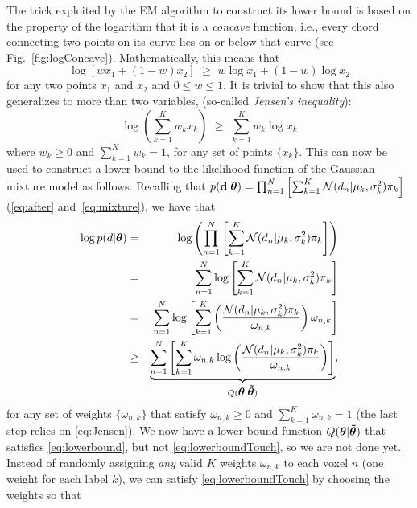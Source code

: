 \documentclass[10pt,twoside]{book}
\begin{document}
The trick exploited by the EM algorithm to construct its lower bound is based on the property of the logarithm that it is a \emph{concave} function, 
i.e., every chord connecting two points on its curve lies on or below that curve (see Fig.~\ref{fig:logConcave}). Mathematically, this means that
\begin{equation}
  \log \left[ w x_1 + ( 1- w ) x_2 \right ] 
  \,\, \geq \,\, 
  w \log x_1 + (1-w) \log x_2
  \nonumber
\end{equation}
for any two points $x_1$ and $x_2$ and $0 \leq w \leq 1$. 
It is trivial to show that this also
generalizes to more than two variables, (so-called \emph{Jensen's inequality}):
\begin{equation}
  \log( \sum_{k=1}^K w_k x_k ) \,\, \geq \,\, \sum_{k=1}^K w_k \log x_k
  \label{eq:Jensen}
\end{equation}
where $w_k \geq 0$ and $\sum_{k=1}^K w_k = 1$, for any set of points $\{ x_k \}$.
This can now be used to construct a lower bound to the likelihood function of the Gaussian mixture model as follows. 
Recalling that $p( \mathbf{d} | {\mbox{\boldmath {${\theta}$}}} ) = \prod_{n=1}^N \left[ \sum_{k=1}^K \mathcal N \mathnormal( d_n | \mu_k, \sigma_k^2 ) \pi_k \right]$ (\eqref{eq:after} and~\eqref{eq:mixture}), we have
that
\begin{eqnarray}
  \log p( d | {\mbox{\boldmath {${\theta}$}}} ) & = & \log \left(  \prod_{n=1}^N \left[ \sum_{k=1}^K \mathcal N \mathnormal( d_n | \mu_k, \sigma_k^2 ) \pi_k \right] \right) \\
                               & = & \sum_{n=1}^N \log \left[ \sum_{k=1}^K \mathcal N \mathnormal( d_n | \mu_k, \sigma_k^2 ) \pi_k \right] \\
                               & = &  \sum_{n=1}^N \log \left[ \sum_{k=1}^K \left( \frac{ \mathcal N \mathnormal( d_n | \mu_k, \sigma_k^2 ) \pi_k }{ \omega_{n,k} } \right) \omega_{n,k}  \right] \\
                               & \geq & \underbrace{ 
                                         \sum_{n=1}^N \left[ \sum_{k=1}^K \omega_{n,k}  \log \left( \frac{ \mathcal N \mathnormal( d_n | \mu_k, \sigma_k^2 ) \pi_k }{ \omega_{n,k} } \right) \right]
                                        }_{Q( {\mbox{\boldmath {${\theta}$}}} | {\mbox{\boldmath {${\tilde{\theta}}$}}} )},
                               \label{eq:EMLowerBound}
\end{eqnarray}
for any set of weights $\{\omega_{n,k}\}$ that satisfy $\omega_{n,k} \geq 0$ and $\sum_{k=1}^K \omega_{n,k} = 1$ (the last step relies on \eqref{eq:Jensen}). We now have a lower bound function $Q( {\mbox{\boldmath {${\theta}$}}} | {\mbox{\boldmath {${\tilde{\theta}}$}}} )$ that 
satisfies \eqref{eq:lowerbound}, but not \eqref{eq:lowerboundTouch}, so we are not done yet. Instead of randomly assigning \emph{any} valid $K$ weights $\omega_{n,k}$ to each voxel $n$ (one weight for each label $k$), we can satisfy \eqref{eq:lowerboundTouch} by choosing the weights so that
\end{document}
